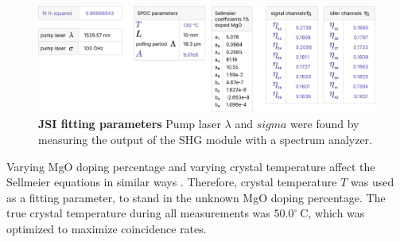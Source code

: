 \documentclass[11pt]{caltech_thesis} %
\begin{document}
\hypertarget{fig:parameters}{%
\begin{figure}
\centering
\includegraphics[width=1\textwidth,height=\textheight]{./chapter_05/figs/fitting_parameters_light.pdf}
\caption[{JSI fitting parameters}]{\textbf{JSI fitting parameters} Pump laser $\lambda$ and $sigma$ were found by measuring the output of the SHG module with a spectrum analyzer.}
\label{fig:parameters}
\end{figure}
}

Varying MgO doping percentage and varying crystal temperature affect the Sellmeier equations in similar ways \autocite{Gayer2008,Jundt1997}. Therefore, crystal temperature $T$ was used as a fitting parameter, to stand in the unknown MgO doping percentage. The true crystal temperature during all measurements was $50.0^{\circ}~\mathrm{C}$, which was optimized to maximize coincidence rates.
\end{document}
